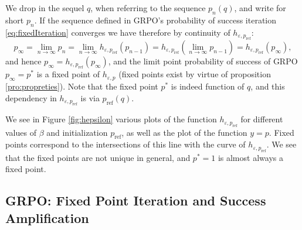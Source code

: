 \documentclass[11pt,reqno]{amsart}
\begin{document}
We drop in the sequel $q$, when referring to the sequence $p_{n}(q)$, and write for short $p_n$. If the sequence defined in  GRPO's probability of success iteration \eqref{eq:fixedIteration} converges we have therefore by continuity of $h_{\varepsilon, p_{\mathrm{ref}}}$:
\[ p_{\infty} = \lim_{n\to \infty} p_{n} = \lim_{n\to \infty} h_{\varepsilon, p_{\mathrm{ref}}}(p_{n-1})=h_{\varepsilon,p_{\mathrm{ref}}} (\lim_{n\to \infty}  p_{n-1}) = h_{\varepsilon,p_{\mathrm{ref}}}(p_{\infty})  ,\]
and hence $p_{\infty} = h_{\varepsilon,p_{\mathrm{ref}}} (p_{\infty})$, and the limit point probability of success of GRPO $p_{\infty}=p^*$ is a fixed point of $h_{\varepsilon,p}$ (fixed points exist by virtue of proposition \ref{pro:propreties}). Note that the fixed point $p^*$ is indeed function of $q$, and this dependency  in $h_{\varepsilon,p_{\mathrm{ref}} }$ is via $p_{\mathrm{ref}}(q)$.

We see in Figure \ref{fig:hepsilon} various plots of the function \( h_{\varepsilon, p_{\mathrm{ref}}} \) for different values of \( \beta \) and initialization \( p_{\mathrm{ref}} \), as well as the plot of the function \( y = p \). Fixed points correspond to the intersections of this line with the curve of \( h_{\varepsilon, p_{\mathrm{ref}}} \). We see that the fixed points are not unique in general, and \( p^* = 1 \) is almost always a fixed point. 










\subsection{GRPO: Fixed Point Iteration  and   Success Amplification } \label{sec:amplificationConvergence}

\end{document}
